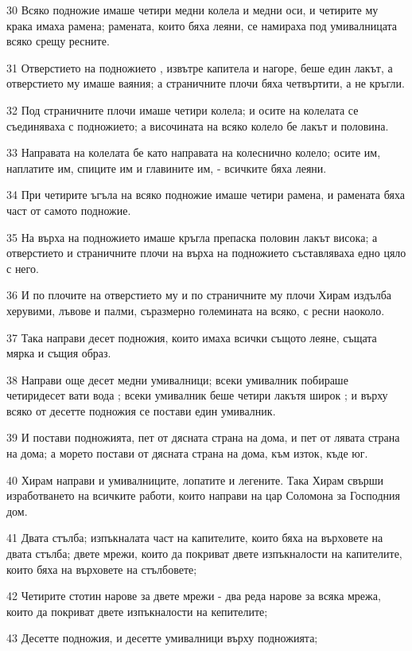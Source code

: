 \par 30 Всяко подножие имаше четири медни колела и медни оси, и четирите му крака имаха рамена; рамената, които бяха леяни, се намираха под умивалницата всяко срещу ресните.
\par 31 Отверстието на подножието , извътре капитела и нагоре, беше един лакът, а отверстието му имаше ваяния; а страничните плочи бяха четвъртити, а не кръгли.
\par 32 Под страничните плочи имаше четири колела; и осите на колелата се съединяваха с подножието; а височината на всяко колело бе лакът и половина.
\par 33 Направата на колелата бе като направата на колеснично колело; осите им, наплатите им, спиците им и главините им, - всичките бяха леяни.
\par 34 При четирите ъгъла на всяко подножие имаше четири рамена, и рамената бяха част от самото подножие.
\par 35 На върха на подножието имаше кръгла препаска половин лакът висока; а отверстието и страничните плочи на върха на подножието съставляваха едно цяло с него.
\par 36 И по плочите на отверстието му и по страничните му плочи Хирам издълба херувими, лъвове и палми, съразмерно големината на всяко, с ресни наоколо.
\par 37 Така направи десет подножия, които имаха всички същото леяне, същата мярка и същия образ.
\par 38 Направи още десет медни умивалници; всеки умивалник побираше четиридесет вати вода ; всеки умивалник беше четири лакътя широк ; и върху всяко от десетте подножия се постави един умивалник.
\par 39 И постави подножията, пет от дясната страна на дома, и пет от лявата страна на дома; а морето постави от дясната страна на дома, към изток, къде юг.
\par 40 Хирам направи и умивалниците, лопатите и легените. Така Хирам свърши изработването на всичките работи, които направи на цар Соломона за Господния дом.
\par 41 Двата стълба; изпъкналата част на капителите, които бяха на върховете на двата стълба; двете мрежи, които да покриват двете изпъкналости на капителите, които бяха на върховете на стълбовете;
\par 42 Четирите стотин нарове за двете мрежи - два реда нарове за всяка мрежа, които да покриват двете изпъкналости на кепителите;
\par 43 Десетте подножия, и десетте умивалници върху подножията;
